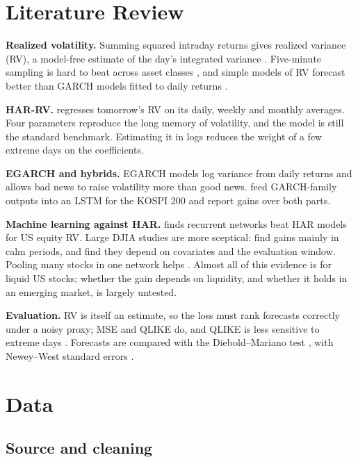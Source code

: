 \section{Literature Review}

\textbf{Realized volatility.} Summing squared intraday returns gives realized variance (RV), a
model-free estimate of the day's integrated variance \citep{andersen2003}. Five-minute sampling is
hard to beat across asset classes \citep{liu2015}, and simple models of RV forecast better than
GARCH models fitted to daily returns \citep{andersen2003}.

\textbf{HAR-RV.} \citet{corsi2009} regresses tomorrow's RV on its daily, weekly and monthly
averages. Four parameters reproduce the long memory of volatility, and the model is still the
standard benchmark. Estimating it in logs reduces the weight of a few extreme days on the
coefficients.

\textbf{EGARCH and hybrids.} EGARCH \citep{nelson1991} models log variance from daily returns and
allows bad news to raise volatility more than good news. \citet{kim2018} feed GARCH-family outputs
into an LSTM \citep{hochreiter1997} for the KOSPI 200 and report gains over both parts.

\textbf{Machine learning against HAR.} \citet{bucci2020} finds recurrent networks beat HAR models
for US equity RV. Large DJIA studies are more sceptical: \citet{rahimikia2020} find gains mainly in
calm periods, and \citet{christensen2023} find they depend on covariates and the evaluation window.
Pooling many stocks in one network helps \citep{zhang2024}. Almost all of this evidence is for
liquid US stocks; whether the gain depends on liquidity, and whether it holds in an emerging market,
is largely untested.

\textbf{Evaluation.} RV is itself an estimate, so the loss must rank forecasts correctly under a noisy
proxy; MSE and QLIKE do, and QLIKE is less sensitive to extreme days \citep{patton2011}. Forecasts are
compared with the Diebold--Mariano test \citep{diebold1995}, with Newey--West standard errors
\citep{neweywest1987}.

\section{Data}

\subsection{Source and cleaning}

